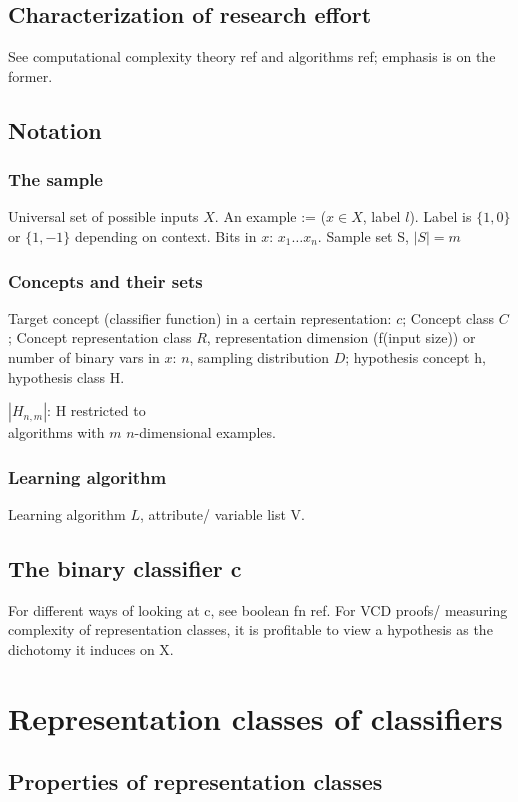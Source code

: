 \documentclass[oneside, article]{memoir}
\begin{document}
\section{Characterization of research effort}
See computational complexity theory ref and algorithms ref; emphasis is on the former.

\section{Notation}
\subsection{The sample}
Universal set of possible inputs $X$. An example := ($x \in X$, label $l$). Label is $\{1,0\}$ or $\{1,-1\}$ depending on context. Bits in $x$: $x_{1}\dots x_{n}$. Sample set S, $|S|=m$

\subsection{Concepts and their sets}
Target concept (classifier function) in a certain representation: $c$; Concept class $C$; Concept representation class $R$, representation dimension (f(input size)) or number of binary vars in $x$: $n$, sampling distribution $D$; hypothesis concept h, hypothesis class H.

$|H_{n,m}|$: H restricted to \\
algorithms with $m$ $n$-dimensional examples. \chk

\subsection{Learning algorithm}
Learning algorithm $L$, attribute/ variable list V.

\section{The binary classifier c}
For different ways of looking at c, see boolean fn ref. For VCD proofs/ measuring complexity of representation classes, it is profitable to view a hypothesis as the dichotomy it induces on X.

\chapter{Representation classes of classifiers}
\section{Properties of representation classes}
\end{document}
